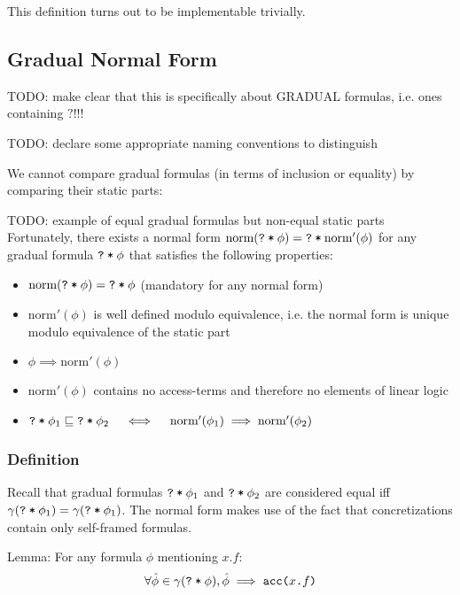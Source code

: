 \documentclass[11pt,a4paper]{article}
\newcommand{\ttt}{\texttt}
\newcommand{\edot}[2]{\ttt{#1.#2}}
\newcommand{\phiAcc}[2]{\ttt{acc(#1.#2)}}
\newcommand{\qm}{\ttt{?}}
\newcommand{\withqm}[1]{\ttt{\qm\:*\:$#1$}}
\begin{document}
This definition turns out to be implementable trivially.

\newcommand{\norm}{\textrm{norm}}
\newcommand{\snorm}{\norm'}
\subsection{Gradual Normal Form}
TODO: make clear that this is specifically about GRADUAL formulas, i.e. ones containing $\qm$!!!

TODO: declare some appropriate naming conventions to distinguish

We cannot compare gradual formulas (in terms of inclusion or equality) by comparing their static parts:

TODO: example of equal gradual formulas but non-equal static parts\\

Fortunately, there exists a normal form $\norm(\withqm{\phi}) = \withqm{\snorm(\phi)}$ for any gradual formula $\withqm{\phi}$ that satisfies the following properties:
\begin{itemize}
	\item $\norm(\withqm{\phi}) = \withqm{\phi}$ (mandatory for any normal form)
	\item $\snorm(\phi)$ is well defined modulo equivalence, i.e. the normal form is unique modulo equivalence of the static part
	\item $\phi \implies \snorm(\phi)$
	\item $\snorm(\phi)$ contains no access-terms and therefore no elements of linear logic
	\item $\withqm{\phi_1} \sqsubseteq \withqm{\phi_2}  \quad\iff\quad  \snorm(\phi_1) \implies \snorm(\phi_2)$
\end{itemize} 

\subsubsection{Definition}
Recall that gradual formulas $\withqm{\phi_1}$ and $\withqm{\phi_2}$ are considered equal iff $\gamma(\withqm{\phi_1}) = \gamma(\withqm{\phi_1})$.
The normal form makes use of the fact that concretizations contain only self-framed formulas.

Lemma:
For any formula $\phi$ mentioning $\edot{$x$}{$f$}$:
$$\forall \hat{\phi} \in \gamma(\withqm{\phi}), \hat{\phi} \implies \phiAcc{$x$}{$f$}$$
\end{document}

